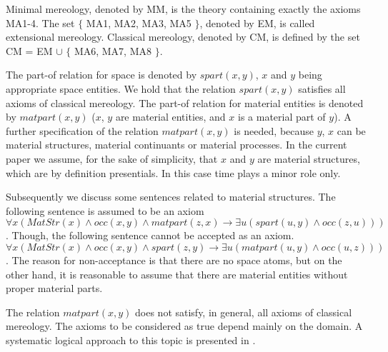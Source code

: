 \documentclass{ao2e}
\begin{document}
{ \begin{enumAx}[MA]
 
 
  
  
 \end{enumAx}
 
 Minimal mereology, denoted by MM, is the theory containing exactly the axioms MA1-4.
 The set $\{$ MA1, MA2, MA3, MA5 $\}$, denoted by EM, is called extensional mereology. Classical mereology, denoted by CM, is defined by the set CM = EM $\cup$ $\{$ MA6, MA7, MA8 $\}$.

The part-of relation for space is denoted by $spart(x,y)$, $x$ and $y$ being appropriate space entities. We hold that the relation $spart(x,y)$ satisfies all axioms of classical mereology.
The part-of relation for material entities is denoted by $matpart(x,y)$ ($x$, $y$ are material entities, and $x$ is a material part of $y$). A further specification of the relation  $matpart(x,y)$ is needed, because $y$, $x$ can be material structures, material continuants or material processes. In the current paper we assume, for the sake of simplicity, that $x$ and $y$ are material structures, which are by definition presentials. In this case time plays a minor role only.

Subsequently we discuss some sentences related to material structures. The following sentence is assumed to be
an axiom $\forall x (MatStr(x) \wedge occ(x, y) \wedge matpart(z,x) \rightarrow \exists u (spart(u, y) \wedge occ(z,u)))$.
Though, the following sentence cannot be accepted as an axiom. $\forall x (MatStr(x) \wedge occ(x, y) \wedge spart(z, y) \rightarrow \exists u (matpart(u, y) \wedge occ(u, z)))$. The reason for non-acceptance is that there are no space atoms, but on the other hand, it is reasonable to assume
that there are material entities without proper material parts.

The relation $matpart(x,y)$ does not satisfy, in general, all axioms of classical mereology. The axioms to be considered as true depend mainly on the domain. A systematic logical approach to this topic is
presented in \cite{herre-h-2010-b}.


}
\end{document}
